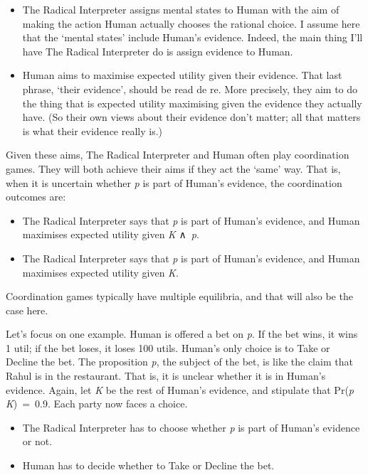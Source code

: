 \documentclass[
  10pt,
  letterpaper,
  twoside]{scrbook}
\providecommand{\tightlist}{%
  \setlength{\itemsep}{0pt}\setlength{\parskip}{0pt}}\usepackage{longtable,booktabs,array}
\begin{document}
\begin{itemize}
\tightlist
\item
  The Radical Interpreter assigns mental states to Human with the aim of
  making the action Human actually chooses the rational choice. I assume
  here that the `mental states' include Human's evidence. Indeed, the
  main thing I'll have The Radical Interpreter do is assign evidence to
  Human.
\item
  Human aims to maximise expected utility given their evidence. That
  last phrase, `their evidence', should be read de re. More precisely,
  they aim to do the thing that is expected utility maximising given the
  evidence they actually have. (So their own views about their evidence
  don't matter; all that matters is what their evidence really is.)
\end{itemize}

Given these aims, The Radical Interpreter and Human often play
coordination games. They will both achieve their aims if they act the
`same' way. That is, when it is uncertain whether \emph{p} is part of
Human's evidence, the coordination outcomes are:

\begin{itemize}
\tightlist
\item
  The Radical Interpreter says that \emph{p} is part of Human's
  evidence, and Human maximises expected utility given \emph{K}
  ∧~\emph{p}.
\item
  The Radical Interpreter says that \emph{p} is part of Human's
  evidence, and Human maximises expected utility given \emph{K}.
\end{itemize}

Coordination games typically have multiple equilibria, and that will
also be the case here.

Let's focus on one example. Human is offered a bet on \emph{p}. If the
bet wins, it wins 1 util; if the bet loses, it loses 100 utils. Human's
only choice is to Take or Decline the bet. The proposition \emph{p}, the
subject of the bet, is like the claim that Rahul is in the restaurant.
That is, it is unclear whether it is in Human's evidence. Again, let
\emph{K} be the rest of Human's evidence, and stipulate that Pr(\emph{p}
\textbar{}\emph{K})~=~0.9. Each party now faces a choice.

\begin{itemize}
\tightlist
\item
  The Radical Interpreter has to choose whether \emph{p} is part of
  Human's evidence or not.
\item
  Human has to decide whether to Take or Decline the bet.
\end{itemize}
\end{document}
